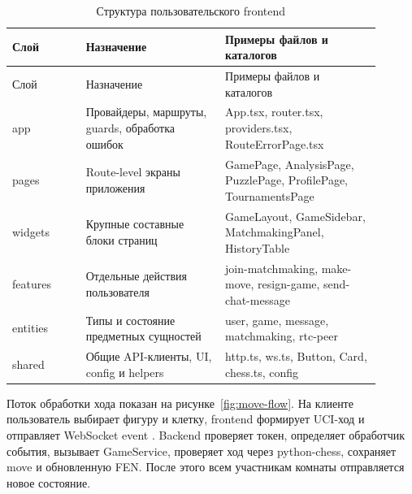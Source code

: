 \noindent\scriptsize
\setlength{\tabcolsep}{3pt}
\renewcommand{\arraystretch}{1.14}
\begin{longtable}{|>{\RaggedRight\arraybackslash}p{0.18\linewidth}|>{\RaggedRight\arraybackslash}p{0.34\linewidth}|>{\RaggedRight\arraybackslash}p{0.38\linewidth}|}
\caption{Структура пользовательского frontend}\label{tab:frontend-structure}\\
\hline
Слой & Назначение & Примеры файлов и каталогов\\ \hline
\endfirsthead
\hline
Слой & Назначение & Примеры файлов и каталогов\\ \hline
\endhead
app & Провайдеры, маршруты, guards, обработка ошибок & App.tsx, router.tsx, providers.tsx, RouteErrorPage.tsx\\ \hline
pages & Route-level экраны приложения & GamePage, AnalysisPage, PuzzlePage, ProfilePage, TournamentsPage\\ \hline
widgets & Крупные составные блоки страниц & GameLayout, GameSidebar, MatchmakingPanel, HistoryTable\\ \hline
features & Отдельные действия пользователя & join-matchmaking, make-move, resign-game, send-chat-message\\ \hline
entities & Типы и состояние предметных сущностей & user, game, message, matchmaking, rtc-peer\\ \hline
shared & Общие API-клиенты, UI, config и helpers & http.ts, ws.ts, Button, Card, chess.ts, config\\ \hline
\end{longtable}
\normalsize

Поток обработки хода показан на рисунке~\ref{fig:move-flow}. На клиенте пользователь выбирает фигуру и клетку, frontend формирует UCI-ход и отправляет WebSocket event . Backend проверяет токен, определяет обработчик события, вызывает GameService, проверяет ход через python-chess, сохраняет move и обновленную FEN. После этого всем участникам комнаты отправляется новое состояние.


